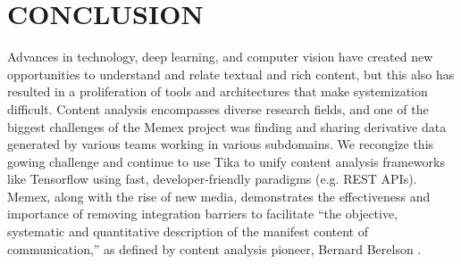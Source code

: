 \section{CONCLUSION} \label{sec:future}
Advances in technology, deep learning, and computer vision have created new opportunities to understand and relate textual and rich content, but this also has resulted in a proliferation of tools and architectures that make systemization difficult. Content analysis encompasses diverse research fields, and one of the biggest challenges of the Memex project was finding and sharing derivative data generated by various teams working in various subdomains. We recongize this gowing challenge and continue to use Tika to unify content analysis frameworks like Tensorflow using fast, developer-friendly paradigms (e.g. REST APIs).  Memex, along with the rise of new media, demonstrates the effectiveness and importance of removing integration barriers to facilitate ``the objective, systematic and quantitative description of the manifest content of communication,'' as defined by content analysis pioneer, Bernard Berelson \cite{berelson1952content}.  